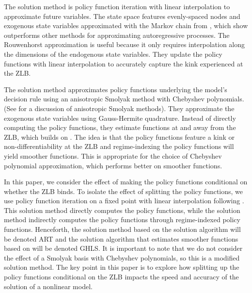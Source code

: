\documentclass[12pt, final]{article}
\begin{document}
The \hyperlink{Atkinson}{\color{black}{Atkinson et al.\ (2019)}} solution method is policy function iteration with linear interpolation to approximate future variables.  The state space features evenly-spaced nodes and exogenous state variables  approximated with the Markov chain from \hyperlink{Rouwenhorst}{\color{black}{Rouwenhorst (1995)}}, which \hyperlink{Kopecky}{\color{black}{Kopecky and Suen (2010)}} show outperforms other methods for approximating autoregressive processes. The Rouwenhorst approximation is useful because it only requires interpolation along the dimensions of the endogenous state variables. They update the policy functions with linear interpolation to accurately capture the kink experienced at the ZLB.

The \hyperlink{Gust}{\color{black}{Gust et al.\ (2017)}} solution method approximates policy functions underlying the model's decision rule using an anisotropic Smolyak method with Chebyshev polynomials. (See \hyperlink{Judd2}{\color{black}{Judd et al.\, 2014}} for a discussion of anisotropic Smolyak methods). They approximate the exogenous state variables using Gauss-Hermite quadrature. Instead of directly computing the policy functions, they estimate functions at and away from the ZLB, which builds on \hyperlink{Christiano}{\color{black}{Christiano and Fisher (2000)}}. The idea is that the policy functions feature a kink or non-differentiability at the ZLB and regime-indexing the policy functions will yield smoother functions. This is appropriate for the choice of Chebyshev polynomial approximation, which performs better on smoother functions. 

In this paper, we consider the effect of making the policy functions conditional on whether the ZLB binds. To isolate the effect of splitting the policy functions, we use policy function iteration on a fixed point with linear interpolation following \hyperlink{Atkinson}{\color{black}{Atkinson et al.\ (2019)}}. This solution method directly computes the policy functions, while the \hyperlink{Gust}{\color{black}{Gust et al.\ (2017)}} solution method indirectly computes the policy functions through regime-indexed policy functions. Henceforth, the solution method based on the \hyperlink{Atkinson}{\color{black}{Atkinson et al.\ (2019)}} solution algorithm will be denoted ART and the solution algorithm that estimates smoother functions based on \hyperlink{Gust}{\color{black}{Gust et al.\ (2017)}} will be denoted GHLS. It is important to note that we do not consider the effect of a Smolyak basis with Chebyshev polynomials, so this is a modified \hyperlink{Gust}{\color{black}{Gust et al.\ (2017)}} solution method. The key point in this paper is to explore how splitting up the policy functions conditional on the ZLB impacts the speed and accuracy of the solution of a nonlinear model. 
\end{document}
